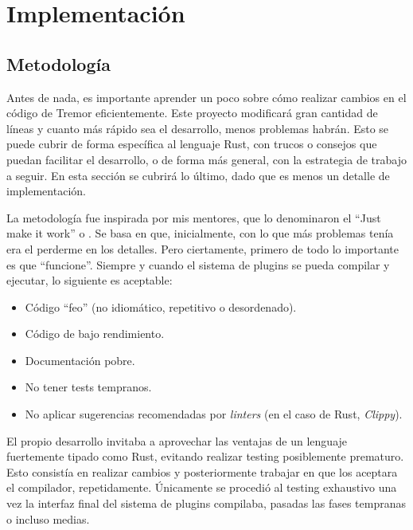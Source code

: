 
\chapter{Implementación}

\section{Metodología}

Antes de nada, es importante aprender un poco sobre cómo realizar cambios en el
código de Tremor eficientemente. Este proyecto modificará gran cantidad de
líneas y cuanto más rápido sea el desarrollo, menos problemas habrán. Esto se
puede cubrir de forma específica al lenguaje Rust, con trucos o consejos que
puedan facilitar el desarrollo, o de forma más general, con la estrategia de
trabajo a seguir. En esta sección se cubrirá lo último, dado que es menos un
detalle de implementación.

La metodología fue inspirada por mis mentores, que lo denominaron el ``Just make
it work'' o \work. Se basa en que, inicialmente, con lo que más problemas tenía
era el perderme en los detalles. Pero ciertamente, primero de todo lo importante
es que ``funcione''. Siempre y cuando el sistema de plugins se pueda compilar y
ejecutar, lo siguiente es aceptable:

\begin{itemize}
    \item Código ``feo'' (no idiomático, repetitivo o desordenado).

    \item Código de bajo rendimiento.

    \item Documentación pobre.

    \item No tener tests tempranos.

    \item No aplicar sugerencias recomendadas por \emph{linters} (en el caso de
        Rust, \emph{Clippy}).

\end{itemize}

El propio desarrollo invitaba a aprovechar las ventajas de un lenguaje
fuertemente tipado como Rust, evitando realizar testing posiblemente prematuro.
Esto consistía en realizar cambios y posteriormente trabajar en que los aceptara
el compilador, repetidamente. Únicamente se procedió al testing exhaustivo una
vez la interfaz final del sistema de plugins compilaba, pasadas las fases
tempranas o incluso medias.

